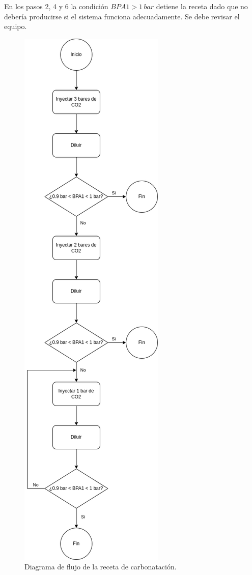 En los pasos 2, 4 y 6 la condición \(BPA1 > 1\,bar\) detiene la receta dado que no debería producirse si el sistema funciona adecuadamente. Se debe revisar el equipo.

\begin{figure}[H]
  \centering
  \includegraphics[height=\textheight]{introduccion-general/img/receta-de-carbonatacion.png}
  \caption{Diagrama de flujo de la receta de carbonatación.}
  \label{fig:receta-de-carbonatacion}
\end{figure}


